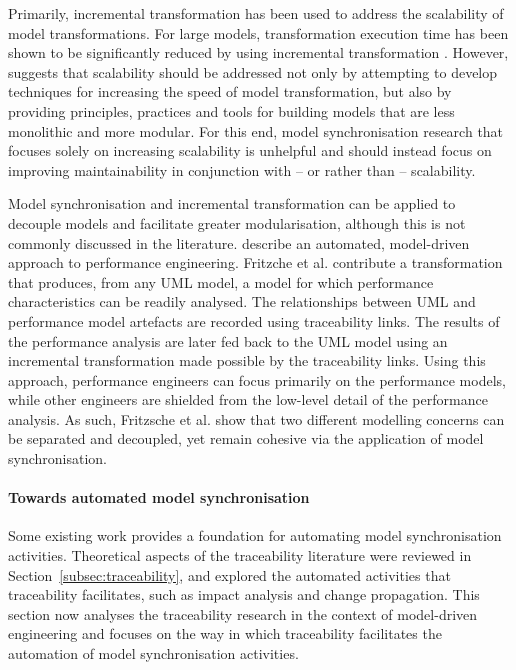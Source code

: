 Primarily, incremental transformation has been used to address the scalability of model transformations. For large models, transformation execution time has been shown to be significantly reduced by using incremental transformation \cite{hearnden06incremental}. However, \cite{kolovos08scalability} suggests that scalability should be addressed not only by attempting to develop techniques for increasing the speed of model transformation, but also by providing principles, practices and tools for building models that are less monolithic and more modular. For this end, model synchronisation research that focuses solely on increasing scalability is unhelpful and should instead focus on improving maintainability in conjunction with -- or rather than -- scalability.

Model synchronisation and incremental transformation can be applied to decouple models and facilitate greater modularisation, although this is not commonly discussed in the literature. \cite{fritzsche08tracing} describe an automated, model-driven approach to performance engineering. Fritzche et al. contribute a transformation that produces, from any UML model, a model for which performance characteristics can be readily analysed. The relationships between UML and performance model artefacts are recorded using traceability links. The results of the performance analysis are later fed back to the UML model using an incremental transformation made possible by the traceability links. Using this approach, performance engineers can focus primarily on the performance models, while other engineers are shielded from the low-level detail of the performance analysis. As such, Fritzsche et al. show that two different modelling concerns can be separated and decoupled, yet remain cohesive via the application of model synchronisation.

\paragraph{Towards automated model synchronisation}
Some existing work provides a foundation for automating model synchronisation activities. Theoretical aspects of the traceability literature were reviewed in Section~\ref{subsec:traceability}, and explored the automated activities that traceability facilitates, such as impact analysis and change propagation.  This section now analyses the traceability research in the context of model-driven engineering and focuses on the way in which traceability facilitates the automation of model synchronisation activities.

